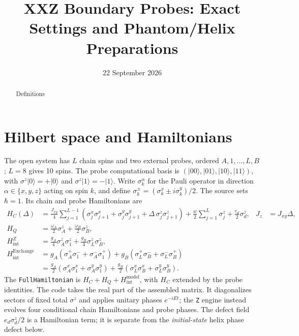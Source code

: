 \documentclass[10pt,a4paper]{article}
\title{XXZ Boundary Probes: Exact Settings and Phantom/Helix Preparations}
\author{}
\date{22 September 2026}
\newcommand{\code}[1]{\texttt{#1}}
\begin{document}
\maketitle
\begin{abstract}
Definitions
\end{abstract}

\section{Hilbert space and Hamiltonians}
The open system has $L$ chain spins and two external probes, ordered $A,1,\ldots,L,B$; $L=8$ gives 10 spins. The probe computational basis is $(|00\rangle,|01\rangle,|10\rangle,|11\rangle)$, with $\sigma^z|0\rangle=+|0\rangle$ and $\sigma^z|1\rangle=-|1\rangle$. Write $\sigma_k^\alpha$ for the Pauli operator in direction $\alpha\in\{x,y,z\}$ acting on spin $k$, and define $\sigma_k^\pm=(\sigma_k^x\pm i\sigma_k^y)/2$. The source sets $\hbar=1$. Its chain and probe Hamiltonians are
\begin{align}
H_C(\Delta)&=\frac{J_{xy}}4\sum_{j=1}^{L-1}\left(
\sigma_j^x\sigma_{j+1}^x+\sigma_j^y\sigma_{j+1}^y
+\Delta\,\sigma_j^z\sigma_{j+1}^z\right)
 +\frac w2\sum_{j=1}^L \sigma_j^z+\frac{e_d}2\sigma_d^z,
& J_z&=J_{xy}\Delta,\\
H_Q&=\frac{\omega_A}{2}\sigma_A^z+\frac{\omega_B}{2}\sigma_B^z,\\
H_{\mathrm{int}}^Z&=\frac{g_A}{4}\sigma_A^z\sigma_1^z
+\frac{g_B}{4}\sigma_L^z\sigma_B^z,\\
H_{\mathrm{int}}^{\mathrm{Exchange}}
&=g_A(\sigma_A^+\sigma_1^-+\sigma_A^-\sigma_1^+)
+g_B(\sigma_L^+\sigma_B^-+\sigma_L^-\sigma_B^+)\\
&=\frac{g_A}{2}(\sigma_A^x\sigma_1^x+\sigma_A^y\sigma_1^y)
+\frac{g_B}{2}(\sigma_L^x\sigma_B^x+\sigma_L^y\sigma_B^y).
\end{align}
The \code{FullHamiltonian} is $H_C+H_Q+H_{\mathrm{int}}^{\mathrm{model}}$, with $H_C$ extended by the probe identities. The code takes the real part of the assembled matrix. It diagonalizes sectors of fixed total $\sigma^z$ and applies unitary phases $e^{-iEt}$; the \code{Z} engine instead evolves four conditional chain Hamiltonians and probe phases. The defect field $e_d\sigma_d^z/2$ is a Hamiltonian term; it is separate from the \emph{initial-state} helix phase defect below.
\end{document}
